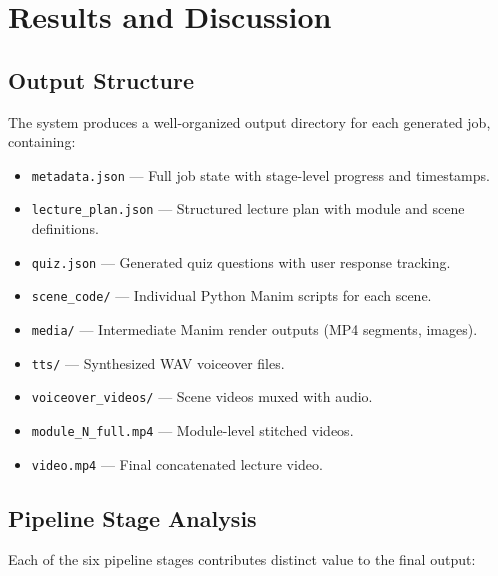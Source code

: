\documentclass[12pt,a4paper,twoside,openright]{report}
\begin{document}
\cleardoublepage


\chapter{Results and Discussion}

\section{Output Structure}

The system produces a well-organized output directory for each generated job, containing:

\begin{itemize}
  \item \texttt{metadata.json} --- Full job state with stage-level progress and timestamps.
  \item \texttt{lecture\_plan.json} --- Structured lecture plan with module and scene definitions.
  \item \texttt{quiz.json} --- Generated quiz questions with user response tracking.
  \item \texttt{scene\_code/} --- Individual Python Manim scripts for each scene.
  \item \texttt{media/} --- Intermediate Manim render outputs (MP4 segments, images).
  \item \texttt{tts/} --- Synthesized WAV voiceover files.
  \item \texttt{voiceover\_videos/} --- Scene videos muxed with audio.
  \item \texttt{module\_N\_full.mp4} --- Module-level stitched videos.
  \item \texttt{video.mp4} --- Final concatenated lecture video.
\end{itemize}

\newpage

\section{Pipeline Stage Analysis}

Each of the six pipeline stages contributes distinct value to the final output:
\end{document}
